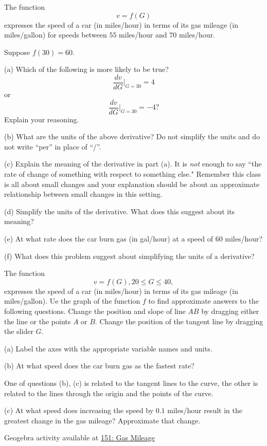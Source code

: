 \documentclass{ximera}
\begin{document}
\begin{question}  \label{Qdsfgbhn54}
The function 
\[
     v = f(G)
\]
expresses the speed of a car (in miles/hour) in terms of its gas mileage (in miles/gallon) for speeds between $55$ miles/hour and $70$ miles/hour. 

Suppose $f(30)=60$.

(a) Which of the following is more likely to be true?
\[
 \frac{dv}{dG}\Big|_{G=30} = 4 
\]
or
\[
   \frac{dv}{dG}\Big|_{G=30} = -4 ?
\]
Explain your reasoning.

(b) What are the units of the above derivative? Do not simplify the units and do not write ``per'' in place of ``/''.

(c) Explain the meaning of the derivative in part (a). It is \emph{not} enough to say ``the rate of change of something with respect to something else." Remember this class is all about small changes and your explanation should be about an approximate relationship between small changes in this setting.

(d) Simplify the units of the derivative. What does this suggest about its meaning?

(e) At what rate does the car burn gas (in gal/hour) at a speed of $60$ miles/hour?

(f) What does this problem suggest about simplifying the units of a derivative? 

\end{question}

\begin{question}  \label{Qdgfv4t5t}
The function 
\[
     v = f(G) , 20\leq G \leq 40,
\]
expresses the speed of a car (in miles/hour) in terms of its gas mileage (in miles/gallon). Ue the graph of the function $f$ to find approximate answers to the following questions. Change the position and slope of line $AB$ by dragging either the line or the points $A$ or $B$. Change the position of the tangent line by dragging the slider $G$.


(a) Label the axes with the appropriate variable names and units.

(b) At what speed does the car burn gas as the fastest rate?

\begin{hint}
One of questions (b), (c) is related to the tangent lines to the curve, the other is related to the lines through the origin and the points of the curve. 
\end{hint}

(c) At what speed does increasing the speed by $0.1$ miles/hour result in the greatest change in the gas mileage? Approximate that change.

\begin{onlineOnly}
    \begin{center}
\end{center}
\end{onlineOnly}

Geogebra activity available at
\href{https://www.geogebra.org/classic/vjdf6x6z}{151: Gas Mileage}


\end{question}
\end{document}
